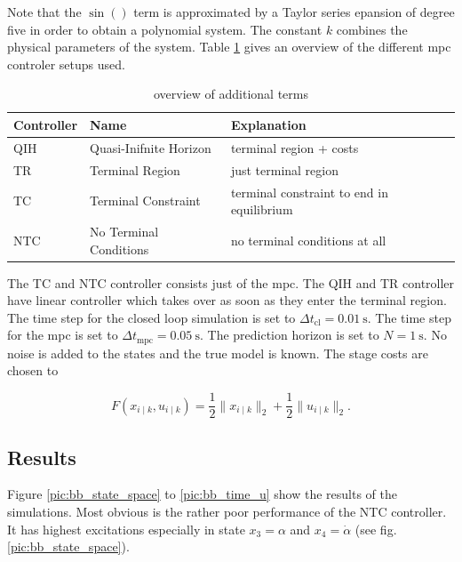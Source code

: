 \documentclass[10pt,a4paper]{article}
\begin{document}
Note that the $\sin()$ term is approximated by a Taylor series epansion of degree five in order to obtain a polynomial system. The constant $k$ combines 
the physical parameters of the system. Table \ref{tbl:controler} gives an overview of the different \gls{mpc} controler setups used.

\renewcommand{\arraystretch}{1.25}
\begin{table}[ht]
    \centering
    \captionsetup{skip=0.25cm}
    \caption{overview of additional terms}
    \label{tbl:controler}
    \begin{tabular}{|p{2cm}|p{4cm}|p{5.5cm}|}
        \hline
        \textbf{Controller} & \textbf{Name} &  \textbf{Explanation}\\
        \hline
        QIH & Quasi-Inifnite Horizon & terminal region + costs\\
        \hline
        TR & Terminal Region & just terminal region\\
        \hline
        TC & Terminal Constraint & terminal constraint to end in equilibrium\\
        \hline
        NTC & No Terminal Conditions & no terminal conditions at all\\
        \hline
    \end{tabular}
\end{table}

The TC and NTC controller consists just of the \gls{mpc}. The QIH and TR controller have linear controller which takes over as soon as they enter the terminal region.
The time step for the closed loop simulation is set to $\Delta t_{\text{cl}} = \SI{0.01}{\second}$.  The time step for the \gls{mpc} is set to
$\Delta t_{\text{mpc}} = \SI{0.05}{\second}$. The prediction horizon is set to $N = \SI{1}{\second}$. No noise is added to the states and the true
model is known. The stage costs are chosen to

\begin{equation}
	F\left(x_{i \mid k}, u_{i \mid k}\right) = \frac{1}{2} \lVert x_{i \mid k} \rVert_2 + \frac{1}{2} \lVert u_{i \mid k} \rVert_2.
\end{equation}


\subsection{Results}
Figure \ref{pic:bb_state_space} to \ref{pic:bb_time_u} show the results of the simulations. Most obvious is the rather poor performance of the NTC controller.
It has highest excitations especially in state $x_3 = \alpha$ and $x_4 = \dot{\alpha}$ (see fig. \ref{pic:bb_state_space}).
\end{document}
